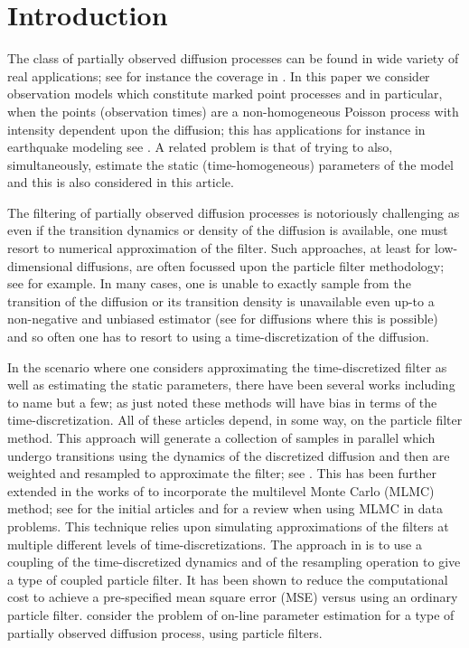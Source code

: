 \documentclass[english]{article}
\begin{document}
\section{Introduction}

The class of partially observed diffusion processes can be found in wide variety of real applications; see for instance the coverage in \cite{crisan_bain,delm:2004}. In this paper we consider observation models which constitute marked point processes and in particular, when the points (observation times) are a non-homogeneous Poisson process with intensity dependent upon the diffusion; this has applications for instance in earthquake modeling see \cite{fearn,jin,martin}. A related problem is that of trying to also, simultaneously, estimate the static (time-homogeneous) parameters of the model and this is also considered in this article.

The filtering of partially observed diffusion processes is notoriously challenging as even if the transition dynamics or density of the diffusion is available, one must resort to numerical approximation of the filter. Such approaches, at least for low-dimensional diffusions, are often focussed upon the particle filter methodology; see \cite{crisan_bain,delm:2004,fearn,mlpf} for example. In many cases, one is unable to exactly sample from the transition of the diffusion or its transition density is unavailable even up-to a non-negative and unbiased estimator (see \cite{fearn} for diffusions where this is possible) and so often one has to resort to using a time-discretization of the diffusion.

In the scenario where one considers approximating the time-discretized filter as well as estimating the static parameters, there have been several works including \cite{archibald, beskos,del_jacod,jin,mlpf,mlpf_nc,mlpf_new} to name but a few; as just noted these methods will have bias in terms of the time-discretization. All of these articles depend, in some way, on the particle filter method. This approach will generate a collection of samples in parallel which undergo transitions using the dynamics of the discretized diffusion and then are weighted and resampled to approximate the filter; see \cite{crisan_bain,delm:2004}. This has been further extended in the works of \cite{beskos,mlpf,mlpf_nc,mlpf_new} to incorporate the multilevel Monte Carlo (MLMC) method; see \cite{giles,giles1,hein} for the initial articles and \cite{ml_rev} for a review when using MLMC in data problems. This technique relies upon simulating approximations of the filters at multiple different levels of time-discretizations. The approach in  \cite{mlpf,mlpf_nc,mlpf_new} is to use a coupling of the time-discretized dynamics and of the resampling operation to give a type of coupled particle filter. It has been shown to reduce the computational cost to achieve a pre-specified mean square error (MSE) versus using an ordinary particle filter.
\cite{beskos} consider the problem of on-line parameter estimation for a type of partially observed diffusion process, using particle filters. 
\end{document}
